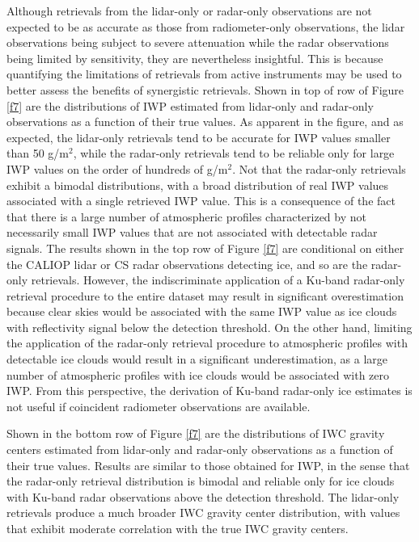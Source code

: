 \documentclass{ametsocV6.1}
\begin{document}
Although retrievals from the lidar-only or radar-only observations are not expected to be as accurate as those from
radiometer-only observations, the lidar observations being subject to severe attenuation while the radar observations
being limited by sensitivity, they are nevertheless insightful. This is because quantifying the limitations of
retrievals from active instruments may be used to better assess  the benefits of synergistic retrievals.  Shown in
top of row of Figure \ref{f7} are the distributions of IWP estimated from lidar-only and radar-only observations 
as a function of their true values. As apparent in the figure, and as expected, the lidar-only retrievals tend to
be accurate for IWP values smaller than 50 g/m$^2$, while the radar-only retrievals tend to be reliable only for large
IWP values on the order of hundreds of g/m$^2$.  Not that the radar-only retrievals exhibit a bimodal distributions,
with a broad distribution of real IWP values associated with a single retrieved IWP value.  This is a consequence
of the fact that there is a large number of atmospheric profiles characterized by not necessarily small IWP values that
are not associated with detectable radar signals. The results shown in the top row of Figure \ref{f7} are conditional on
either the CALIOP lidar or CS radar observations detecting ice, and so are the radar-only retrievals. However, the 
indiscriminate application of a Ku-band radar-only retrieval procedure to the entire dataset may result in significant
overestimation because clear skies would be associated with the same IWP value as ice clouds with reflectivity signal 
below the detection threshold. On the other hand, limiting the application of the radar-only retrieval procedure to atmospheric profiles
with detectable ice clouds would result in a significant underestimation, as a large number of atmospheric profiles
with ice clouds would be associated with zero IWP.  From this perspective, the derivation of  Ku-band radar-only ice estimates
is not useful if coincident radiometer observations are available.

Shown in the bottom row of Figure \ref{f7} are the distributions of IWC gravity centers
estimated from lidar-only and radar-only observations as a function of their true values. Results are similar to those
obtained for IWP, in the sense that the radar-only retrieval distribution is bimodal and reliable only for ice clouds
with Ku-band radar observations above the detection threshold.
The lidar-only retrievals produce a much broader IWC gravity center distribution, with values that exhibit moderate 
correlation with the true IWC gravity centers.  
\end{document}
